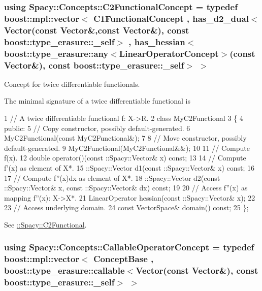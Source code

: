 \subsubsection[{C2\+Functional\+Concept}]{\setlength{\rightskip}{0pt plus 5cm}using {\bf Spacy\+::\+Concepts\+::\+C2\+Functional\+Concept} = typedef boost\+::mpl\+::vector$<$ C1\+Functional\+Concept , has\+\_\+d2\+\_\+dual$<$Vector(const Vector\&,const Vector\&), const boost\+::type\+\_\+erasure\+::\+\_\+self$>$ , has\+\_\+hessian$<$boost\+::type\+\_\+erasure\+::any$<$Linear\+Operator\+Concept$>$(const Vector\&), const boost\+::type\+\_\+erasure\+::\+\_\+self$>$ $>$}\label{group__ConceptGroup_gafb4414561b07b27100cad81ecf152e47_gafb4414561b07b27100cad81ecf152e47}


Concept for twice differentiable functionals. 

\label{group__ConceptGroup_gafb4414561b07b27100cad81ecf152e47_C2FunctionalConceptAnchor}%
\hypertarget{group__ConceptGroup_gafb4414561b07b27100cad81ecf152e47_C2FunctionalConceptAnchor}{}%
The minimal signature of a twice differentiable functional is 
\begin{DoxyCode}
1 // A twice differentiable functional f: X->R.
2 class MyC2Functional
3 \{
4 public:
5   // Copy constructor, possibly default-generated.
6   MyC2Functional(const MyC2Functional&);
7 
8   // Move constructor, possibly default-generated.
9   MyC2Functional(MyC2Functional&&);
10 
11   // Compute f(x).
12   double operator()(const ::Spacy::Vector& x) const;
13 
14   // Compute f'(x) as element of X*.
15   ::Spacy::Vector d1(const ::Spacy::Vector& x) const;
16 
17   // Compute f''(x)dx as element of X*.
18   ::Spacy::Vector d2(const ::Spacy::Vector& x, const ::Spacy::Vector& dx) const;
19 
20   // Access f''(x) as mapping f''(x): X->X*.
21   LinearOperator hessian(const ::Spacy::Vector& x);
22 
23   // Access underlying domain.
24   const VectorSpace& domain() const;
25 \};
\end{DoxyCode}


See \hyperlink{group__SpacyGroup_gaf5b89e117806134b06a1ce4629fb2b65_C2FunctionalAnchor}{\+:\+:Spacy\+:\+:C2\+Functional}. \hypertarget{group__ConceptGroup_gadec0c664abaacc2065dadd8b11cc8d30_gadec0c664abaacc2065dadd8b11cc8d30}{}
\subsubsection[{Callable\+Operator\+Concept}]{\setlength{\rightskip}{0pt plus 5cm}using {\bf Spacy\+::\+Concepts\+::\+Callable\+Operator\+Concept} = typedef boost\+::mpl\+::vector$<$ Concept\+Base , boost\+::type\+\_\+erasure\+::callable$<$Vector(const Vector\&), const boost\+::type\+\_\+erasure\+::\+\_\+self$>$ $>$}\label{group__ConceptGroup_gadec0c664abaacc2065dadd8b11cc8d30_gadec0c664abaacc2065dadd8b11cc8d30}


